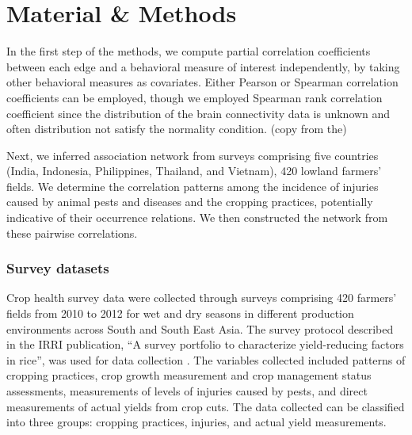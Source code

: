 \documentclass{frontiersSCNS} %
\begin{document}


\section{Material \& Methods}


In the first step of the methods, we compute partial correlation coefficients between each edge and a behavioral measure of interest independently, by taking other behavioral measures as covariates. Either Pearson or Spearman correlation coefficients can be employed, though we employed Spearman rank correlation coefficient since the distribution of the brain connectivity data is unknown and often distribution not satisfy the normality condition. (copy from the)

Next, we inferred association network from surveys comprising five countries (India, Indonesia, Philippines, Thailand, and Vietnam), 420 lowland farmers' fields. We determine the correlation patterns among the incidence of injuries caused by animal pests and diseases and the cropping practices, potentially indicative of their occurrence relations. We then constructed the network from these pairwise correlations. 

\subsubsection*{Survey datasets}
Crop health survey data were collected through surveys comprising 420 farmers' fields from 2010 to 2012 for wet and dry seasons in different production environments across South and South East Asia. The survey protocol described in the IRRI publication, ``A survey portfolio to characterize yield-reducing factors in rice'', was used for data collection \citep{Savarysurvey2009}. The variables collected included patterns of cropping practices, crop growth measurement and crop management status assessments, measurements of levels of injuries caused by pests, and direct measurements of actual yields from crop cuts. The data collected can be classified into three groups: cropping practices, injuries, and actual yield measurements.
\end{document}
